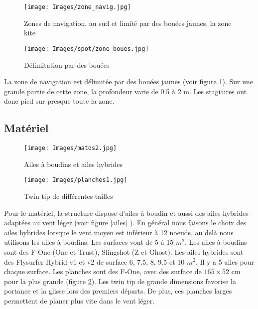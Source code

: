 \documentclass[11pt,a4paper]{report}
\begin{document}
%

\begin{figure}
\begin{minipage}{0.4\textwidth}
\texttt{[image: Images/zone\_navig.jpg]}
\caption{Zones de navigation, au sud et limité par des bouées jaunes,
la zone kite\label{zones_nav}} 
\end{minipage}
\hfill
\begin{minipage}{0.4\textwidth}
\texttt{[image: Images/spot/zone\_boues.jpg]}
\caption{Délimitation par des bouées\label{boue}}
\end{minipage}
\end{figure}
La zone de navigation est délimitée par des bouées jaunes (voir figure \ref{boue}). 
Sur une grande partie de cette zone, la profondeur varie de 0.5 à 2 m.
Les stagiaires ont donc pied sur presque toute la zone.

\FloatBarrier
\subsection{Matériel}
\begin{figure}[h]
\begin{minipage}{0.4\textwidth}
\texttt{[image: Images/matos2.jpg]} 
\caption{Ailes à boudins et ailes hybrides\label{ailes}}
\end{minipage}
\hfill
\begin{minipage}{0.4\textwidth}
\texttt{[image: Images/planches1.jpg]} 
\caption{Twin tip de différentes tailles\label{planches}}
\end{minipage}
\end{figure}
Pour le matériel, la structure dispose d'ailes à boudin et aussi 
des ailes hybrides adaptées au vent léger (voir figure \ref{ailes} ).
En général nous faisons
le choix des ailes hybrides lorsque le vent moyen est inférieur à
12 noeuds, au delà nous utilisons les ailes à boudins. Les
surfaces vont de 5 à 15 $m^2$. 
Les ailes à boudins sont des F-One (One et Trust), Slingshot (Z et Ghost).
Les ailes hybrides sont des Flysurfer Hybrid v1 et v2 de surface 6, 7.5, 8,
9.5 et 10 $m^2$. Il y a 5 ailes pour chaque surface.
Les planches sont des F-One, avec des surface de $165\times52$ cm
pour la plus grande (figure \ref{planches}).
Les twin tip de grande dimensions favorise la portance et la glisse
lors des premiers départs. De plus, ces planches larges permettent
de planer plus vite dans le vent léger.
\end{document}
